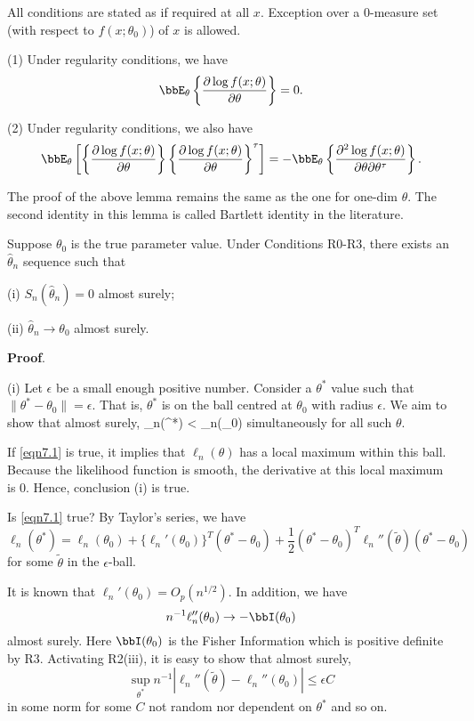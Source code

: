 All conditions are stated as if required at all $x$. Exception over a 0-measure set
(with respect to $f(x; \theta_0)$) of $x$ is allowed.

\begin{lemma}
(1) Under regularity conditions, we have
\[
\bbE_\theta \left \{ \frac{\partial \log f(x; \theta)}{\partial \theta} \right \} = 0.
\]

(2)  Under regularity conditions, we also have
\[
\bbE_\theta 
\left [
\left \{ \frac{\partial \log f(x; \theta)}{\partial \theta} \right \} \left \{ \frac{\partial \log f(x; \theta)}{\partial \theta} \right \}^\tau
\right ]
=
-
\bbE_\theta \left \{ \frac{\partial^2 \log f(x; \theta)}{\partial \theta \partial \theta^\tau } \right \}.
\]
\end{lemma}


The proof of the above lemma remains the same as the one for one-dim $\theta$.
The second identity in this lemma is called Bartlett identity in the literature.
 
 
\begin{theorem}
Suppose $\theta_0$ is the true parameter value.
Under Conditions R0-R3, there exists an $\hat \theta_n$ sequence
such that

(i) $S_n(\hat \theta_n) =0$ almost surely; 

(ii) $\hat \theta_n \to \theta_0$ almost surely.
\end{theorem}

\vs\no
{\bf Proof}. 

(i) Let $\epsilon$ be a small enough positive number. 
Consider a $\theta^*$ value such that $\| \theta^* - \theta_0\| = \epsilon$.
That is, $\theta^*$ is on the ball centred at $\theta_0$ with radius $\epsilon$.
We aim to show that almost surely,
\be
\label{eqn7.1}
\ell_n(\theta^*) < \ell_n(\theta_0)
\ee
simultaneously for all such $\theta$.

If \eqref{eqn7.1} is true, it implies that $\ell_n(\theta)$ has a local maximum
within this ball. Because the likelihood function is smooth, the
derivative at this local maximum is 0. Hence, conclusion
(i) is true. 

Is \eqref{eqn7.1} true? By Taylor's series, we have
\[
\ell_n(\theta^*) 
=
\ell_n(\theta_0) + \{ \ell_n'(\theta_0)\}^T (\theta^* - \theta_0)
+ \frac{1}{2} (\theta^* - \theta_0)^T \ell_n''(\tilde \theta) (\theta^* - \theta_0)
\]
for some $\tilde \theta$ in the $\epsilon$-ball.

It is known that $ \ell_n'(\theta_0) = O_p(n^{1/2})$.
In addition, we have
\[
n^{-1}  \ell_n''(\theta_0) \to - \bbI(\theta_0)
\]
almost surely. Here $\bbI(\theta_0)$ is the Fisher Information
which is positive definite by R3.
Activating R2(iii), it is easy to show that almost surely,
\[
\sup_{\theta^*} n^{-1} | \ell_n''(\tilde \theta) -  \ell_n''(\theta_0)|
\leq  \epsilon C
\]
in some norm
for some $C$ not random nor dependent on $\theta^*$ and so on.

